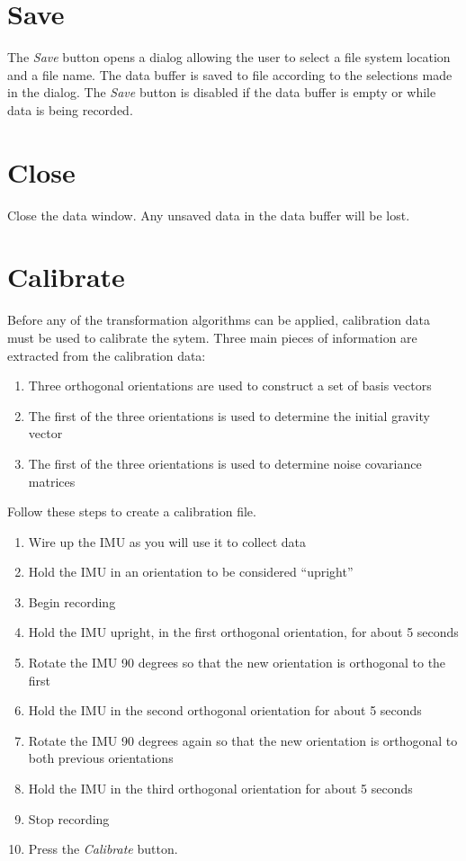 \documentclass[11pt,letterpaper,article,oneside]{memoir}
\begin{document}
\section{Save}

The \emph{Save} button opens a dialog allowing the user to select a file system
location and a file name.  The data buffer is saved to file according to the
selections made in the dialog. The \emph{Save} button is disabled if the data
buffer is empty or while data is being recorded.

\section{Close}

Close the data window. Any unsaved data in the data buffer will be lost.



\section{Calibrate}

Before any of the transformation algorithms can be applied, calibration data
must be used to calibrate the sytem.  Three main pieces of information are
extracted from the calibration data:

\begin{enumerate}
\item Three orthogonal orientations are used to construct a set of basis vectors
\item The first of the three orientations is used to determine the initial gravity vector
\item The first of the three orientations is used to determine noise covariance matrices
\end{enumerate}


Follow these steps to create a calibration file.

\begin{enumerate}
\item Wire up the IMU as you will use it to collect data
\item Hold the IMU in an orientation to be considered ``upright''
\item Begin recording
\item Hold the IMU upright, in the first orthogonal orientation, for about 5 seconds
\item Rotate the IMU 90 degrees so that the new orientation is orthogonal to the first
\item Hold the IMU in the second orthogonal orientation for about 5 seconds
\item Rotate the IMU 90 degrees again so that the new orientation is orthogonal to both previous orientations
\item Hold the IMU in the third orthogonal orientation for about 5 seconds
\item Stop recording
\item Press the \emph{Calibrate} button.
\end{enumerate}
\end{document}

